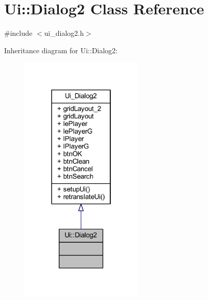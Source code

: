 \hypertarget{class_ui_1_1_dialog2}{}\section{Ui\+:\+:Dialog2 Class Reference}
\label{class_ui_1_1_dialog2}


{\ttfamily \#include $<$ui\+\_\+dialog2.\+h$>$}



Inheritance diagram for Ui\+:\+:Dialog2\+:
\nopagebreak
\begin{figure}[H]
\begin{center}
\leavevmode
\includegraphics[width=166pt]{d9/dd1/class_ui_1_1_dialog2__inherit__graph}
\end{center}
\end{figure}


